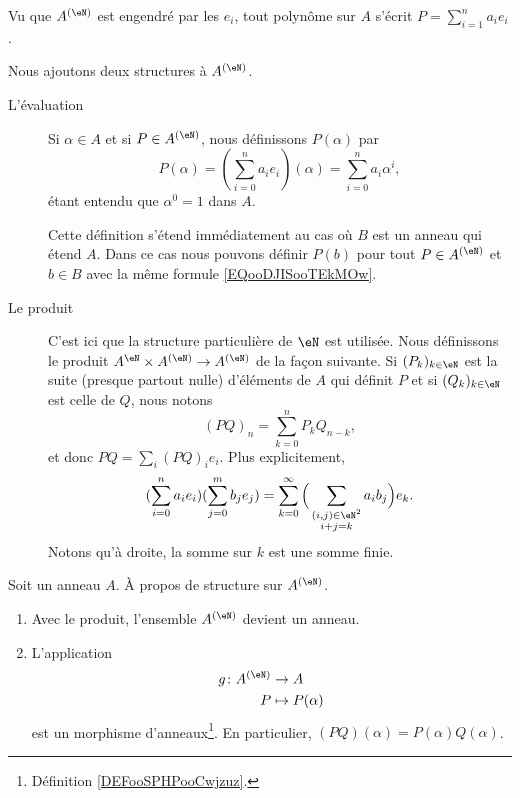 Vu que \( A^{(\eN)}\) est engendré par les \( e_i\), tout polynôme sur \( A\) s'écrit \( P=\sum_{i=1}^na_ie_i\).

\begin{definition}      \label{DEFooNXKUooLrGeuh}
    Nous ajoutons deux structures à \( A^{(\eN)}\).
    \begin{description}
        \item[L'évaluation] Si \( \alpha\in A\) et si \( P\in A^{(\eN)}\), nous définissons \( P(\alpha)\) par
            \begin{equation}        \label{EQooDJISooTEkMOw}
                P(\alpha)=(\sum_{i=0}^{n}a_ie_i)(\alpha)=\sum_{i=0}^na_i\alpha^i,
            \end{equation}
            étant entendu que \( \alpha^0=1\) dans \( A\).

            Cette définition s'étend immédiatement au cas où \( B\) est un anneau qui étend \( A\). Dans ce cas nous pouvons définir \( P(b)\) pour tout \( P\in A^{(\eN)}\) et \( b\in B\) avec la même formule \eqref{EQooDJISooTEkMOw}.
        \item[Le produit] C'est ici que la structure particulière de \( \eN\) est utilisée. Nous définissons le produit \( A^{\eN}\times A^{(\eN)}\to A^{(\eN)}\) de la façon suivante. Si \( (P_k)_{k\in \eN}\) est la suite (presque partout nulle) d'éléments de \( A\) qui définit \( P\) et si \( (Q_k)_{k\in \eN}\) est celle de \( Q\), nous notons
        \begin{equation}    \label{EQooTNCSooKklisb}
            (PQ)_n=\sum_{k=0}^nP_kQ_{n-k},
        \end{equation}
        et donc \( PQ=\sum_i(PQ)_ie_i\). Plus explicitement,
        \begin{equation}    \label{EQooCIBUooAgpxjL}
            (\sum_{i=0}^na_ie_i)(\sum_{j=0}^mb_je_j)=\sum_{k=0}^{\infty}\Big( \sum_{\substack{  (i,j)\in \eN^2 \\i+j=k}}a_ib_j \Big)e_k.
        \end{equation}
        Notons qu'à droite, la somme sur \( k\) est une somme finie.
    \end{description}
\end{definition}

\begin{proposition}     \label{PROPooGDQCooHziCPH}
    Soit un anneau \( A\). À propos de structure sur \( A^{(\eN)}\).
    \begin{enumerate}
        \item
            Avec le produit, l'ensemble \( A^{(\eN)}\) devient un anneau.
        \item
    L'application
    \begin{equation}
        \begin{aligned}
            g\colon A^{(\eN)}&\to A \\
            P&\mapsto P(\alpha)
        \end{aligned}
    \end{equation}
    est un morphisme d'anneaux\footnote{Définition \ref{DEFooSPHPooCwjzuz}.}. En particulier, \( (PQ)(\alpha)=P(\alpha)Q(\alpha)\).
    \end{enumerate}
\end{proposition}

